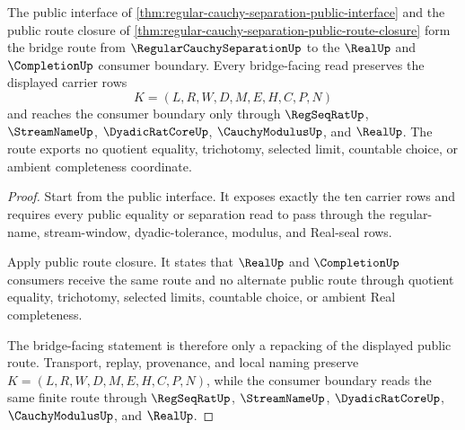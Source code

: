 \begin{theorem}
\label{thm:regular-cauchy-separation-bridge-route}
The public interface of \autoref{thm:regular-cauchy-separation-public-interface} and the public route closure of \autoref{thm:regular-cauchy-separation-public-route-closure} form the bridge route from $\RegularCauchySeparationUp$ to the $\RealUp$ and $\CompletionUp$ consumer boundary. Every bridge-facing read preserves the displayed carrier rows
$$
K=(L,R,W,D,M,E,H,C,P,N)
$$
and reaches the consumer boundary only through $\RegSeqRatUp$, $\StreamNameUp$, $\DyadicRatCoreUp$, $\CauchyModulusUp$, and $\RealUp$. The route exports no quotient equality, trichotomy, selected limit, countable choice, or ambient completeness coordinate.
\end{theorem}
\begin{proof}
Start from the public interface. It exposes exactly the ten carrier rows and requires every public equality or separation read to pass through the regular-name, stream-window, dyadic-tolerance, modulus, and Real-seal rows.

Apply public route closure. It states that $\RealUp$ and $\CompletionUp$ consumers receive the same route and no alternate public route through quotient equality, trichotomy, selected limits, countable choice, or ambient Real completeness.

The bridge-facing statement is therefore only a repacking of the displayed public route. Transport, replay, provenance, and local naming preserve $K=(L,R,W,D,M,E,H,C,P,N)$, while the consumer boundary reads the same finite route through $\RegSeqRatUp$, $\StreamNameUp$, $\DyadicRatCoreUp$, $\CauchyModulusUp$, and $\RealUp$.
\end{proof}

